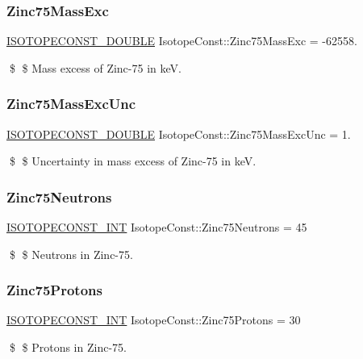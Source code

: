 \subsubsection{\texorpdfstring{Zinc75\+Mass\+Exc}{Zinc75MassExc}}
{\footnotesize\ttfamily \mbox{\hyperlink{group___isotope_const-_macros_ga8f45a7272ce02c0b4c65c44636ed719a}{I\+S\+O\+T\+O\+P\+E\+C\+O\+N\+S\+T\+\_\+\+D\+O\+U\+B\+LE}} Isotope\+Const\+::\+Zinc75\+Mass\+Exc = -\/62558.}

\$ \$ Mass excess of Zinc-\/75 in keV. \mbox{\label{group___isotope_const-_zinc-_zn75_gacac609c137a23691bb436a17c22ef164}} 
\subsubsection{\texorpdfstring{Zinc75\+Mass\+Exc\+Unc}{Zinc75MassExcUnc}}
{\footnotesize\ttfamily \mbox{\hyperlink{group___isotope_const-_macros_ga8f45a7272ce02c0b4c65c44636ed719a}{I\+S\+O\+T\+O\+P\+E\+C\+O\+N\+S\+T\+\_\+\+D\+O\+U\+B\+LE}} Isotope\+Const\+::\+Zinc75\+Mass\+Exc\+Unc = 1.}

\$ \$ Uncertainty in mass excess of Zinc-\/75 in keV. \mbox{\label{group___isotope_const-_zinc-_zn75_gaf4a5436404e40c41ae3d37237eaf63a0}} 
\subsubsection{\texorpdfstring{Zinc75\+Neutrons}{Zinc75Neutrons}}
{\footnotesize\ttfamily \mbox{\hyperlink{group___isotope_const-_macros_ga5f18360b3e99483a35c32d789e62621c}{I\+S\+O\+T\+O\+P\+E\+C\+O\+N\+S\+T\+\_\+\+I\+NT}} Isotope\+Const\+::\+Zinc75\+Neutrons = 45}

\$ \$ Neutrons in Zinc-\/75. \mbox{\label{group___isotope_const-_zinc-_zn75_ga18699b1d6b5223ce87e48ddac69e6cf9}} 
\subsubsection{\texorpdfstring{Zinc75\+Protons}{Zinc75Protons}}
{\footnotesize\ttfamily \mbox{\hyperlink{group___isotope_const-_macros_ga5f18360b3e99483a35c32d789e62621c}{I\+S\+O\+T\+O\+P\+E\+C\+O\+N\+S\+T\+\_\+\+I\+NT}} Isotope\+Const\+::\+Zinc75\+Protons = 30}

\$ \$ Protons in Zinc-\/75. 
